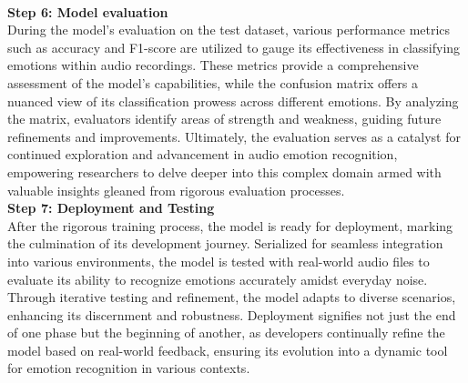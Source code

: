 \\
\textbf{Step 6: Model evaluation}
\\
During the model's evaluation on the test dataset, various performance metrics such as accuracy and F1-score are utilized to gauge its effectiveness in classifying emotions within audio recordings. These metrics provide a comprehensive assessment of the model's capabilities, while the confusion matrix offers a nuanced view of its classification prowess across different emotions. By analyzing the matrix, evaluators identify areas of strength and weakness, guiding future refinements and improvements. Ultimately, the evaluation serves as a catalyst for continued exploration and advancement in audio emotion recognition, empowering researchers to delve deeper into this complex domain armed with valuable insights gleaned from rigorous evaluation processes.
\\
\textbf{Step 7: Deployment and Testing}
\\
After the rigorous training process, the model is ready for deployment, marking the culmination of its development journey. Serialized for seamless integration into various environments, the model is tested with real-world audio files to evaluate its ability to recognize emotions accurately amidst everyday noise. Through iterative testing and refinement, the model adapts to diverse scenarios, enhancing its discernment and robustness. Deployment signifies not just the end of one phase but the beginning of another, as developers continually refine the model based on real-world feedback, ensuring its evolution into a dynamic tool for emotion recognition in various contexts.
